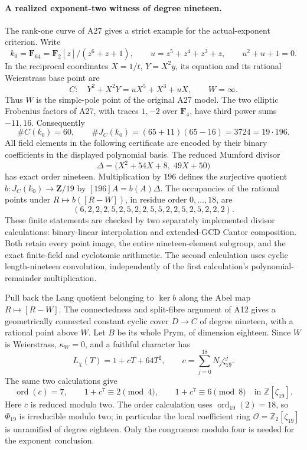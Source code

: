 \paragraph{A realized exponent-two witness of degree nineteen.}
The rank-one curve of A27 gives a strict example for the
actual-exponent criterion. Write
\[
 k_0=\mathbf F_{64}=\mathbf F_2[z]/(z^6+z+1),\qquad
 u=z^5+z^4+z^3+z,
 \qquad u^2+u+1=0.
\]
In the reciprocal coordinates $X=1/t$, $Y=X^2y$, its equation
and its rational Weierstrass base point are
\[
 C:\quad Y^2+X^2Y=uX^5+X^3+uX,
              \qquad W=\infty.
 \tag{BE.14}
\]
Thus $W$ is the simple-pole point of the original A27 model.
The two elliptic Frobenius factors of A27, with traces $1,-2$
over $\mathbf F_4$, have third power sums $-11,16$.
Consequently
\[
 \#C(k_0)=60,\qquad
 \#J_C(k_0)=(65+11)(65-16)=3724=19\cdot196.
 \tag{BE.15}
\]
All field elements in the following certificate are encoded
by their binary coefficients in the displayed polynomial basis.
The reduced Mumford divisor
\[
 \Delta=\bigl(X^2+54X+8,\;49X+50\bigr)
 \tag{BE.16}
\]
has exact order nineteen. Multiplication by $196$ defines
the surjective quotient $b:J_C(k_0)\to\mathbf Z/19$ by
$[196]A=b(A)\Delta$. The occupancies of the rational points
under $R\mapsto b([R-W])$, in residue order $0,\ldots,18$, are
\[
 (6,2,2,2,5,2,5,2,2,5,5,2,2,5,2,5,2,2,2).
 \tag{BE.17}
\]
These finite statements are checked by two separately
implemented divisor calculations: binary-linear interpolation
and extended-GCD Cantor composition. Both retain every point
image, the entire nineteen-element subgroup, and the exact
finite-field and cyclotomic arithmetic. The second calculation
uses cyclic length-nineteen convolution, independently of the
first calculation's polynomial-remainder multiplication.

Pull back the Lang quotient belonging to $\ker b$ along the
Abel map $R\mapsto[R-W]$. The connectedness and split-fibre
argument of A12 gives a geometrically connected constant
cyclic cover $D\to C$ of degree nineteen, with a rational
point above $W$. Let $B$ be its whole Prym, of dimension
eighteen. Since $W$ is Weierstrass, $\kappa_W=0$, and a
faithful character has
\[
 L_\chi(T)=1+cT+64T^2,
      \qquad c=\sum_{j=0}^{18}N_j\zeta_{19}^j.
 \tag{BE.18}
\]
The same two calculations give
\[
 \operatorname{ord}(\bar c)=7,
 \qquad 1+c^7\equiv2\pmod4,
 \qquad 1+c^7\equiv6\pmod8
 \quad\text{in }\mathbb Z[\zeta_{19}].
 \tag{BE.19}
\]
Here $\bar c$ is reduced modulo two. The order calculation
uses $\operatorname{ord}_{19}(2)=18$, so $\Phi_{19}$ is
irreducible modulo two; in particular the local coefficient
ring $\mathcal O=\mathbb Z_2[\zeta_{19}]$ is unramified of
degree eighteen. Only the congruence modulo four is needed
for the exponent conclusion.

